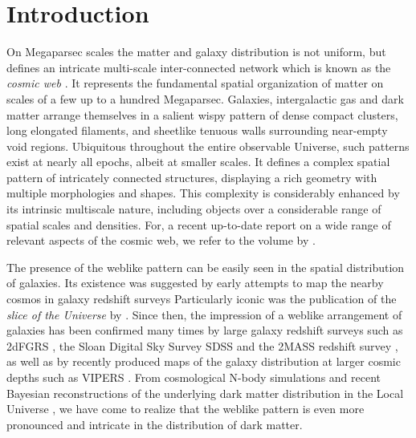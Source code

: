 \documentclass[useAMS,usenatbib]{mnras}
\begin{document}
\section{Introduction}
\label{section:intro}
On Megaparsec scales the matter and galaxy distribution is not uniform, but defines an intricate multi-scale inter-connected network 
which is known as the \emph{cosmic web} \citep{bondweb1996}. It represents the fundamental spatial organization of 
matter on scales of a few up to a hundred Megaparsec. Galaxies, intergalactic gas and dark matter arrange themselves in a salient wispy 
pattern of dense compact clusters, long elongated filaments, and sheetlike tenuous walls surrounding near-empty void regions. Ubiquitous throughout  
the entire observable Universe, such patterns  exist at nearly all epochs, albeit at smaller scales. It defines a complex spatial 
pattern of intricately connected structures, displaying a rich geometry with multiple morphologies and shapes. This complexity is 
considerably enhanced by its intrinsic multiscale nature, including objects over a considerable range of spatial scales and densities. 
For, a recent up-to-date report on a wide range of relevant aspects of the cosmic web, we refer to the volume by \cite{iau308}.

The presence of the weblike pattern can be easily seen in the spatial distribution of galaxies. Its existence was  suggested 
by early attempts to map the nearby cosmos in galaxy redshift surveys \citep{gregthomp1978,joeveer1978b,lapparent1986,geller1989,shectman1996} 
Particularly iconic was the publication of the \emph{slice of the Universe} by \cite{lapparent1986}. Since then, the impression 
of a weblike arrangement of galaxies has been confirmed many times by large galaxy redshift surveys such as 2dFGRS 
\citep{colless2003,weyschaap2009}, the Sloan Digital Sky Survey SDSS \citep{tegmark2004} and the 2MASS redshift survey \citep{huchra2012}, 
as well as by recently produced maps of the galaxy distribution at larger cosmic depths such as VIPERS \citep{vipers2014}. 
From cosmological N-body simulations \citep[e.g.][]{springmillen2005,illustris2014,eagle2015} and recent Bayesian reconstructions of the 
underlying dark matter distribution in the Local Universe \citep{hess2013,kitaura2013,2014MNRAS.445..988N,leclercq2015,sorce2016}, we have 
come to realize that the weblike pattern is even more pronounced and intricate in the distribution of dark matter.

\end{document}
